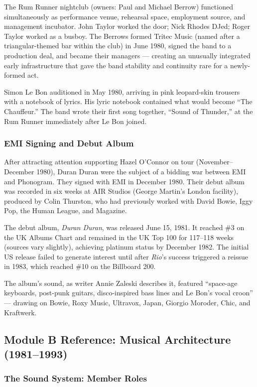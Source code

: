 \documentclass[11pt,letterpaper]{article}
\begin{document}
The Rum Runner nightclub (owners: Paul and Michael Berrow) functioned simultaneously as performance venue, rehearsal space, employment source, and management incubator. John Taylor worked the door; Nick Rhodes DJed; Roger Taylor worked as a busboy. The Berrows formed Tritec Music (named after a triangular-themed bar within the club) in June 1980, signed the band to a production deal, and became their managers --- creating an unusually integrated early infrastructure that gave the band stability and continuity rare for a newly-formed act.

Simon Le Bon auditioned in May 1980, arriving in pink leopard-skin trousers with a notebook of lyrics. His lyric notebook contained what would become ``The Chauffeur.'' The band wrote their first song together, ``Sound of Thunder,'' at the Rum Runner immediately after Le Bon joined.

\subsubsection{EMI Signing and Debut Album}

After attracting attention supporting Hazel O'Connor on tour (November--December 1980), Duran Duran were the subject of a bidding war between EMI and Phonogram. They signed with EMI in December 1980. Their debut album was recorded in six weeks at AIR Studios (George Martin's London facility), produced by Colin Thurston, who had previously worked with David Bowie, Iggy Pop, the Human League, and Magazine.

The debut album, \textit{Duran Duran}, was released June 15, 1981. It reached \#3 on the UK Albums Chart and remained in the UK Top 100 for 117--118 weeks (sources vary slightly), achieving platinum status by December 1982. The initial US release failed to generate interest until after \textit{Rio}'s success triggered a reissue in 1983, which reached \#10 on the Billboard 200.

The album's sound, as writer Annie Zaleski describes it, featured ``space-age keyboards, post-punk guitars, disco-inspired bass lines and Le Bon's vocal croon'' --- drawing on Bowie, Roxy Music, Ultravox, Japan, Giorgio Moroder, Chic, and Kraftwerk.

\subsection{Module B Reference: Musical Architecture (1981--1993)}

\subsubsection{The Sound System: Member Roles}
\end{document}
